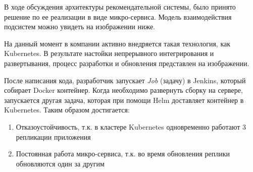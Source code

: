 В ходе обсуждения архитектуры рекомендательной системы, было принято решение по
ее реализации в виде микро-сервиса. Модель взаимодействия подсистем можно увидеть
на изображении ниже.

На данный момент в компании активно внедряется такая технология, как Kubernetes.
В результате настойки непрерывного интегрирования и развертывания, процесс
разработки и обновления представлен на изображении.

После написания кода, разработчик запускает \textit{Job} (задачу) в Jenkins, который
собирает Docker контейнер. Когда необходимо развернуть сборку на сервере, запускается
другая задача, которая при помощи Helm доставляет контейнер в Kubernetes. Таким
образом достигается:
\begin{enumerate}
  \item Отказоустойчивость, т.к. в кластере Kubernetes одновременно работают
  3 репликации приложения
  \item Постоянная работа микро-сервиса, т.к. во время обновления реплики обновляются
  один за другим
\end{enumerate}
